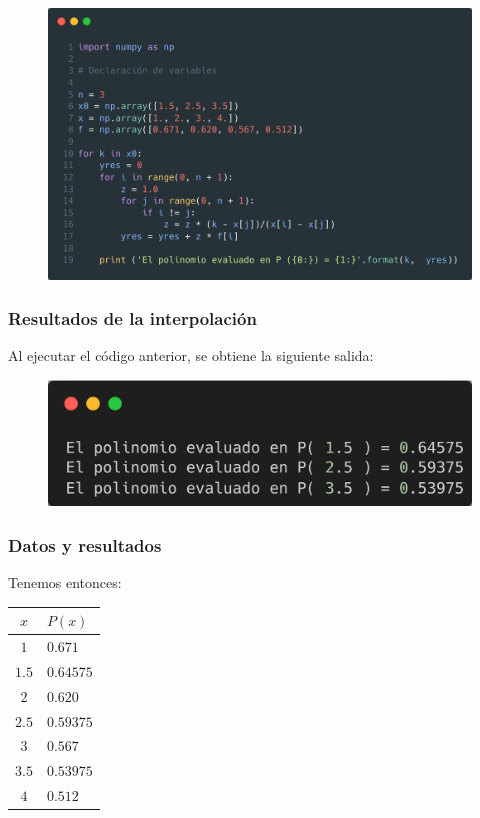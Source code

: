 \documentclass[12pt]{beamer}
\begin{document}
\begingroup
{}
\begin{frame}[plain]
\begin{figure}
    \centering
    \includegraphics[width=\textwidth,height=\textheight,keepaspectratio]{Imagenes/Interpolacion_Codigo_03.png}
\end{figure}
\end{frame}
\endgroup
\begin{frame}
\frametitle{Resultados de la interpolación}
Al ejecutar el código anterior, se obtiene la siguiente salida:
\pause

\begin{figure}
    \centering
    \includegraphics[width=\textwidth,height=\textheight,keepaspectratio]{Imagenes/Interpolacion_Codigo_03_Terminal.png}
\end{figure}
\end{frame}
\begin{frame}[fragile]
\frametitle{Datos y resultados}
Tenemos entonces:
\pause
\begin{table}
\centering
\renewcommand{\arraystretch}{0.9}
\begin{tabular}{c | l}
$x$ & $P (x)$ \\
\hline $1$   & $0.671$ \\
\hline $1.5$ & $0.64575$ \\
\hline $2$   & $0.620$ \\
\hline $2.5$ & $0.59375$ \\
\hline $3$   & $0.567$ \\
\hline $3.5$ & $0.53975$ \\
\hline $4$   & $0.512$
\end{tabular}
\end{table}
\end{frame}
\end{document}
